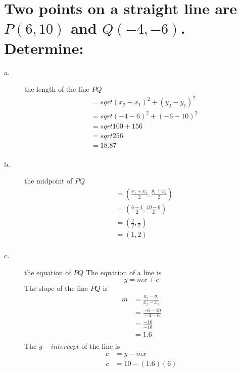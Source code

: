 \documentclass{article}
\begin{document}
\section{Two points on a straight line are $P(6, 10)$ and $Q(-4, -6)$. Determine:}
\begin{description}
    \item[a.] the length of the line $PQ$
        $$
            \begin{aligned}
                 & = sqrt{(x_2 - x_1)^2 + (y_2-y_1)^2} \\
                 & = sqrt{(-4-6)^2 + (-6-10)^2}        \\
                 & = sqrt{100+156}                     \\
                 & = sqrt{256}                         \\
                 & = 18.87                             \\
            \end{aligned}
        $$
    \item[b.] the midpoint of $PQ$
        $$
            \begin{aligned}
                 & = (\frac{x_1+x_2}{2}, \frac{y_1+y_2}{2}) \\
                 & = (\frac{6-4}{2}, \frac{10-6}{2})        \\
                 & = (\frac{2}{2}, \frac{}{2})              \\
                 & = (1, 2)                                 \\
            \end{aligned}
        $$
    \item[c.] the equation of $PQ$
        The equation of a line is
        $$
            y = mx+c
        $$
        The slope of the line $PQ$ is
        $$
            \begin{aligned}
                m & = \frac{y_2-y_1}{x_2-x_1} \\
                  & = \frac{-6-10}{-4-6}      \\
                  & = \frac{-16}{-10}         \\
                  & = 1.6                     \\
            \end{aligned}
        $$
        The $y-intercept$ of the line is
        $$
            \begin{aligned}
                c & = y - mx        \\
                c & = 10 - (1.6)(6) \\

\end{aligned}$$
\end{description}
\end{document}

